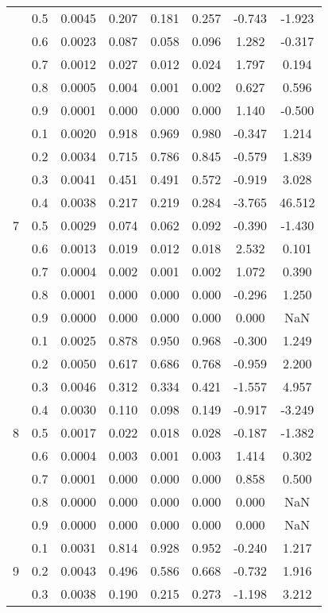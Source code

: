 \documentclass[11pt,a4paper]{report}
\begin{document}
\begin{longtable}{ | c | c || c | c | c | c | c | c | }
 & 0.5 & 0.0045 & 0.207 & 0.181 & 0.257 & -0.743 & -1.923 \\
 & 0.6 & 0.0023 & 0.087 & 0.058 & 0.096 & 1.282 & -0.317 \\
 & 0.7 & 0.0012 & 0.027 & 0.012 & 0.024 & 1.797 & 0.194 \\
 & 0.8 & 0.0005 & 0.004 & 0.001 & 0.002 & 0.627 & 0.596 \\
 & 0.9 & 0.0001 & 0.000 & 0.000 & 0.000 & 1.140 & -0.500 \\
 \hline
\multirow{9}{*}{7} & 0.1 & 0.0020 & 0.918 & 0.969 & 0.980 & -0.347 & 1.214 \\
 & 0.2 & 0.0034 & 0.715 & 0.786 & 0.845 & -0.579 & 1.839 \\
 & 0.3 & 0.0041 & 0.451 & 0.491 & 0.572 & -0.919 & 3.028 \\
 & 0.4 & 0.0038 & 0.217 & 0.219 & 0.284 & -3.765 & 46.512 \\
 & 0.5 & 0.0029 & 0.074 & 0.062 & 0.092 & -0.390 & -1.430 \\
 & 0.6 & 0.0013 & 0.019 & 0.012 & 0.018 & 2.532 & 0.101 \\
 & 0.7 & 0.0004 & 0.002 & 0.001 & 0.002 & 1.072 & 0.390 \\
 & 0.8 & 0.0001 & 0.000 & 0.000 & 0.000 & -0.296 & 1.250 \\
 & 0.9 & 0.0000 & 0.000 & 0.000 & 0.000 & 0.000 & NaN \\
 \hline
\multirow{9}{*}{8} & 0.1 & 0.0025 & 0.878 & 0.950 & 0.968 & -0.300 & 1.249 \\
 & 0.2 & 0.0050 & 0.617 & 0.686 & 0.768 & -0.959 & 2.200 \\
 & 0.3 & 0.0046 & 0.312 & 0.334 & 0.421 & -1.557 & 4.957 \\
 & 0.4 & 0.0030 & 0.110 & 0.098 & 0.149 & -0.917 & -3.249 \\
 & 0.5 & 0.0017 & 0.022 & 0.018 & 0.028 & -0.187 & -1.382 \\
 & 0.6 & 0.0004 & 0.003 & 0.001 & 0.003 & 1.414 & 0.302 \\
 & 0.7 & 0.0001 & 0.000 & 0.000 & 0.000 & 0.858 & 0.500 \\
 & 0.8 & 0.0000 & 0.000 & 0.000 & 0.000 & 0.000 & NaN \\
 & 0.9 & 0.0000 & 0.000 & 0.000 & 0.000 & 0.000 & NaN \\
 \hline
\multirow{9}{*}{9} & 0.1 & 0.0031 & 0.814 & 0.928 & 0.952 & -0.240 & 1.217 \\
 & 0.2 & 0.0043 & 0.496 & 0.586 & 0.668 & -0.732 & 1.916 \\
 & 0.3 & 0.0038 & 0.190 & 0.215 & 0.273 & -1.198 & 3.212 \\

\end{longtable}
\end{document}
